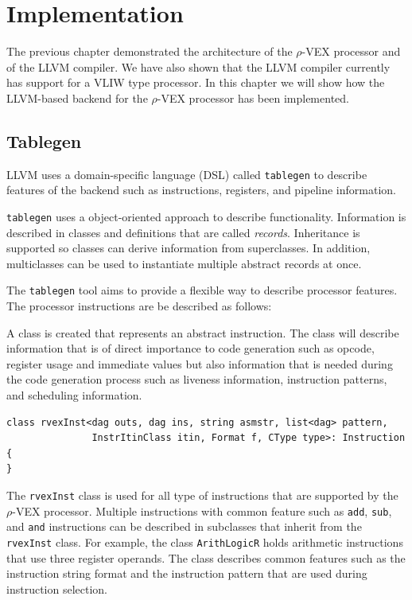 \chapter{Implementation}
\label{chap:implementation}
The previous chapter demonstrated the architecture of the $\rho$-VEX processor and of the LLVM compiler. We have also shown that the LLVM compiler currently has support for a VLIW type processor. In this chapter we will show how the LLVM-based backend for the $\rho$-VEX processor has been implemented.

\section{Tablegen}
LLVM uses a domain-specific language (DSL) called \texttt{tablegen} to describe features of the backend such as instructions, registers, and pipeline information. 

\texttt{tablegen} uses a object-oriented approach to describe functionality. Information is described in classes and definitions that are called \emph{records}. Inheritance is supported so classes can derive information from superclasses. In addition, multiclasses can be used to instantiate multiple abstract records at once.

The \texttt{tablegen} tool aims to provide a flexible way to describe processor features. The processor instructions are be described as follows:

A class is created that represents an abstract instruction. The class will describe information that is of direct importance to code generation such as opcode, register usage and immediate values but also information that is needed during the code generation process such as liveness information, instruction patterns, and scheduling information.

\begin{lstlisting}[language=tblgen, caption={Base $\rho$-VEX instruction}]
class rvexInst<dag outs, dag ins, string asmstr, list<dag> pattern,
               InstrItinClass itin, Format f, CType type>: Instruction
{
}
\end{lstlisting}

The \texttt{rvexInst} class is used for all type of instructions that are supported by the $\rho$-VEX processor. Multiple instructions with common feature such as \texttt{add}, \texttt{sub}, and \texttt{and} instructions can be described in subclasses that inherit from the \texttt{rvexInst} class. For example, the class \texttt{ArithLogicR} holds arithmetic instructions that use three register operands. The class describes common features such as the instruction string format and the instruction pattern that are used during instruction selection.

